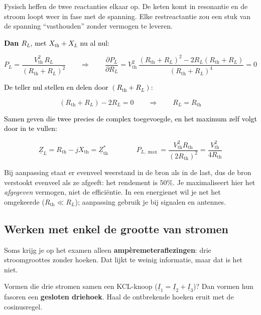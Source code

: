 \documentclass[a4paper,11pt]{article}
\newcommand{\stapreden}[1]{\par\vspace{1.4mm}\noindent\textcolor{black}{#1}\par\vspace{-2mm}}
\begin{document}
Fysisch heffen de twee reactanties elkaar op. De keten komt in resonantie en de stroom loopt weer
in fase met de spanning. Elke restreactantie zou een stuk van de spanning ``vasthouden'' zonder
vermogen te leveren.

\stapreden{\textbf{Dan $R_L$}, met $X_{\text{th}}+X_L$ nu al nul:}
\[P_L = \frac{V_{\text{th}}^2\,R_L}{(R_{\text{th}}+R_L)^2}
    \qquad\Longrightarrow\qquad
    \frac{\partial P_L}{\partial R_L}
    = V_{\text{th}}^2\,\frac{(R_{\text{th}}+R_L)^2 - 2R_L(R_{\text{th}}+R_L)}{(R_{\text{th}}+R_L)^4} = 0\]

\stapreden{De teller nul stellen en delen door $(R_{\text{th}}+R_L)$:}
\[(R_{\text{th}}+R_L) - 2R_L = 0 \qquad\Longrightarrow\qquad \boxed{R_L = R_{\text{th}}}\]

\stapreden{Samen geven die twee precies de complex toegevoegde, en het maximum zelf volgt door in te vullen:}
\[\underline{Z}_L = R_{\text{th}} - jX_{\text{th}} = \underline{Z}_{\text{th}}^{*}
    \qquad\qquad
    P_{L,\max} = \frac{V_{\text{th}}^2 R_{\text{th}}}{(2R_{\text{th}})^2} = \frac{V_{\text{th}}^2}{4R_{\text{th}}}\]

Bij aanpassing staat er evenveel weerstand in de bron als in de last, dus de bron verstookt evenveel
als ze afgeeft: het rendement is $50\%$. Je maximaliseert hier het \emph{afgegeven} vermogen, niet
de effici\"entie. In een energienet wil je net het omgekeerde ($R_{\text{th}} \ll R_L$); aanpassing
gebruik je bij signalen en antennes.

\subsection{Werken met enkel de grootte van stromen}

Soms krijg je op het examen alleen \textbf{ampèremeteraflezingen}: drie stroomgroottes zonder
hoeken. Dat lijkt te weinig informatie, maar dat is het niet.

Vormen die drie stromen samen een KCL-knoop ($\underline{I}_1 = \underline{I}_2 + \underline{I}_3$)?
Dan vormen hun fasoren een \textbf{gesloten driehoek}. Haal de ontbrekende hoeken eruit met de
cosinusregel.
\end{document}
